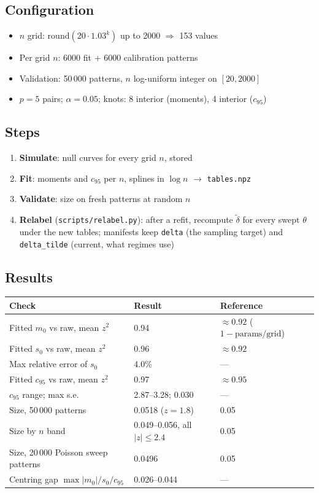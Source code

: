 \documentclass[11pt]{article}
\newcommand{\dt}{\tilde\delta}
\begin{document}
\subsection*{Configuration}
\begin{itemize}
  \item $n$ grid: $\mathrm{round}(20 \cdot 1.03^k)$ up to 2000 $\Rightarrow$ 153 values
  \item Per grid $n$: 6000 fit + 6000 calibration patterns
  \item Validation: 50\,000 patterns, $n$ log-uniform integer on $[20, 2000]$
  \item $p = 5$ pairs; $\alpha = 0.05$; knots: 8 interior (moments), 4 interior ($c_{95}$)
\end{itemize}

\subsection*{Steps}
\begin{enumerate}
  \item \textbf{Simulate}: null curves for every grid $n$, stored
  \item \textbf{Fit}: moments and $c_{95}$ per $n$, splines in $\log n$ $\to$ \texttt{tables.npz}
  \item \textbf{Validate}: size on fresh patterns at random $n$
  \item \textbf{Relabel} (\texttt{scripts/relabel.py}): after a refit, recompute $\dt$ for every swept $\theta$ under the new tables; manifests keep \texttt{delta} (the sampling target) and \texttt{delta\_tilde} (current, what regimes use)
\end{enumerate}

\subsection*{Results}
\begin{tabular}{@{}lll@{}}
\toprule
Check & Result & Reference \\
\midrule
Fitted $m_0$ vs raw, mean $z^2$ & 0.94 & $\approx 0.92$ ($1 - \text{params}/\text{grid}$) \\
Fitted $s_0$ vs raw, mean $z^2$ & 0.96 & $\approx 0.92$ \\
Max relative error of $s_0$ & 4.0\% & --- \\
Fitted $c_{95}$ vs raw, mean $z^2$ & 0.97 & $\approx 0.95$ \\
$c_{95}$ range; max s.e. & 2.87--3.28; 0.030 & --- \\
Size, 50\,000 patterns & 0.0518 ($z = 1.8$) & 0.05 \\
Size by $n$ band & 0.049--0.056, all $|z| \le 2.4$ & 0.05 \\
Size, 20\,000 Poisson sweep patterns & 0.0496 & 0.05 \\
Centring gap $\max|m_0|/s_0/c_{95}$ & 0.026--0.044 & --- \\
\bottomrule
\end{tabular}
\end{document}
